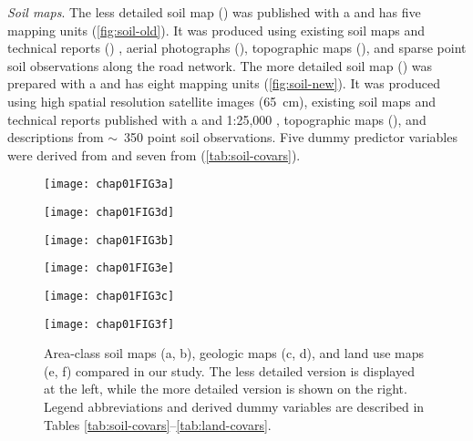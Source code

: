 \noindent\textit{Soil maps}. The less detailed soil map (\soilOld) was published with a 
 and has five mapping units \citep{AzolinEtAl1988} 
(\autoref{fig:soil-old}). It was produced using existing soil maps and technical
reports () \citep{Brasil1973}, aerial photographs 
(), topographic maps (), and sparse point soil 
observations along the road network. The more detailed soil map (\soilNew) was 
prepared with a  and has eight mapping units \citep{MiguelEtAl2012}
(\autoref{fig:soil-new}). It was produced using high spatial resolution satellite
images (65~cm), existing soil maps and technical reports published with a 
 \citep{Poelking2007} and 1:25,000 \citep{PedronEtAl2006b}, 
topographic maps (), and descriptions from $\sim$~350 point soil 
observations. Five dummy predictor variables were derived from \soilOld{} and 
seven from \soilNew{} (\autoref{tab:soil-covars}).

 \begin{figure}[!ht]
    \centering
    \begin{minipage}[b]{63mm}
       \label{fig:soil-old}
       \centering
       \texttt{[image: chap01FIG3a]}
    \end{minipage}
    \begin{minipage}[b]{63mm}
       \label{fig:soil-new}
       \centering
       \texttt{[image: chap01FIG3d]}
    \end{minipage}    
    \begin{minipage}[b]{63mm}
       \label{fig:geo-old}
       \centering
       \texttt{[image: chap01FIG3b]}
    \end{minipage}
    \begin{minipage}[b]{63mm}
       \label{fig:geo-new}
       \centering
       \texttt{[image: chap01FIG3e]}
    \end{minipage}
    \begin{minipage}[b]{63mm}
       \label{fig:land-old}
       \centering
       \texttt{[image: chap01FIG3c]}
    \end{minipage}
    \begin{minipage}[b]{63mm}
       \label{fig:land-new}
       \centering
       \texttt{[image: chap01FIG3f]}
    \end{minipage}
   \caption{Area-class soil maps (a, b), geologic maps (c, d), and land use 
   maps (e, f) compared in our study. The less detailed version is displayed 
   at the left, while the more detailed version is shown on the right. Legend 
   abbreviations and derived dummy variables are described in Tables 
   \ref{tab:soil-covars}--\ref{tab:land-covars}.}
  \label{fig:cat-covars}
\end{figure}

